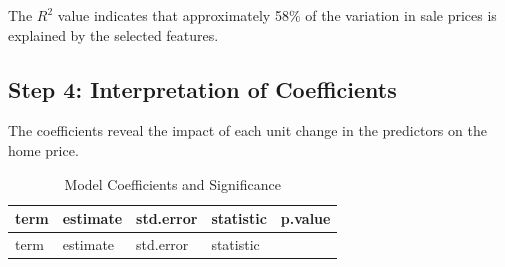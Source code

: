 \documentclass[
  english,
  letterpaper,
  DIV=11,
  numbers=noendperiod]{scrreprt}
\begin{document}
The \(R^2\) value indicates that approximately 58\% of the variation in
sale prices is explained by the selected features.

\subsection{Step 4: Interpretation of
Coefficients}\label{step-4-interpretation-of-coefficients}

The coefficients reveal the impact of each unit change in the predictors
on the home price.

\begin{longtable}[]{@{}
  >{\raggedright\arraybackslash}p{}
  >{\raggedleft\arraybackslash}p{}
  >{\raggedleft\arraybackslash}p{}
  >{\raggedleft\arraybackslash}p{}
  >{\raggedleft\arraybackslash}p{}@{}}
\caption{Model Coefficients and Significance}\tabularnewline
\toprule\noalign{}
\begin{minipage}[b]{\linewidth}\raggedright
term
\end{minipage} & \begin{minipage}[b]{\linewidth}\raggedleft
estimate
\end{minipage} & \begin{minipage}[b]{\linewidth}\raggedleft
std.error
\end{minipage} & \begin{minipage}[b]{\linewidth}\raggedleft
statistic
\end{minipage} & \begin{minipage}[b]{\linewidth}\raggedleft
p.value
\end{minipage} \\
\midrule\noalign{}
\endfirsthead
\toprule\noalign{}
\begin{minipage}[b]{\linewidth}\raggedright
term
\end{minipage} & \begin{minipage}[b]{\linewidth}\raggedleft
estimate
\end{minipage} & \begin{minipage}[b]{\linewidth}\raggedleft
std.error
\end{minipage} & \begin{minipage}[b]{\linewidth}\raggedleft
statistic
\end{minipage} & \begin{minipage}[b]{\linewidth}\raggedleft

\end{minipage}
\end{longtable}
\end{document}

